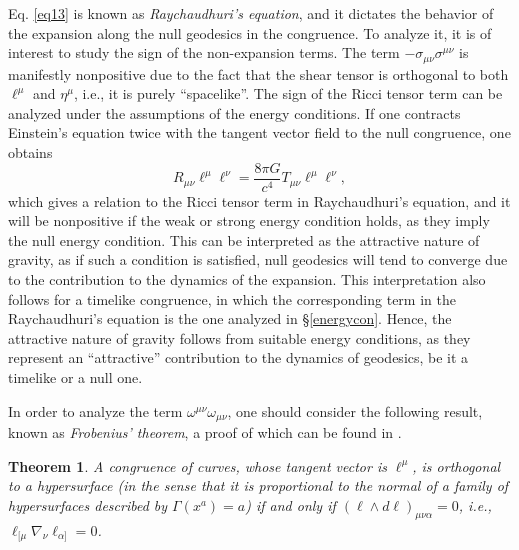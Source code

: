 \documentclass[
12pt,		%
openright,	%
twoside,  %
a4paper,			%
chapter=TITLE,		%
english,			%
french,				%
spanish,			%
brazil				%
]{USPSC-classe/USPSC}
\newtheorem{theorem}{Theorem}[section]
\begin{document}
Eq. \ref{eq13} is known as \textit{Raychaudhuri's equation}, and it dictates the behavior of the expansion along the null geodesics in the congruence. To analyze it, it is of interest to study the sign of the non-expansion terms. The term $-\sigma_{\mu\nu}\sigma^{\mu\nu}$ is manifestly nonpositive due to the fact that the shear tensor is orthogonal to both $\ell^{\mu}$ and $\eta^{\mu}$, i.e., it is purely ``spacelike''. The sign of the Ricci tensor term can be analyzed under the assumptions of the energy conditions. If one contracts Einstein's equation twice with the tangent vector field to the null congruence, one obtains
\begin{equation}\label{eq17}
    R_{\mu\nu}\ell^{\mu}\ell^{\nu}=\frac{8\pi G}{c^4} T_{\mu\nu}\ell^{\mu}\ell^{\nu},
\end{equation}
which gives a relation to the Ricci tensor term in Raychaudhuri's equation, and it will be nonpositive if the weak or strong energy condition holds, as they imply the null energy condition. This can be interpreted as the attractive nature of gravity, as if such a condition is satisfied, null geodesics will tend to converge due to the contribution to the dynamics of the expansion. This interpretation also follows for a timelike congruence, in which the corresponding term in the Raychaudhuri's equation is the one analyzed in \S\;\ref{energycon}. Hence, the attractive nature of gravity follows from suitable energy conditions, as they represent an ``attractive'' contribution to the dynamics of geodesics, be it a timelike or a null one.

In order to analyze the term $\omega^{\mu\nu}\omega_{\mu\nu}$, one should consider the following result, known as \textit{Frobenius' theorem}, a proof of which can be found in \cite{Wald1984}. 
\begin{theorem}\label{frobenius}
    A congruence of curves, whose tangent vector is $\ell^{\mu}$, is orthogonal to a hypersurface (in the sense that it is proportional to the normal of a family of hypersurfaces described by $\Gamma(x^{a})=a$) if and only if $(\ell\wedge d\ell)_{\mu\nu\alpha}=0$, i.e., $\ell_{[\mu}\nabla_{\nu}\ell_{\alpha]}=0$.
\end{theorem}
\end{document}
